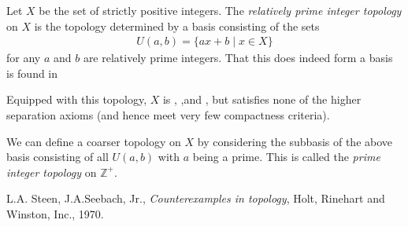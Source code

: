 \documentclass[12pt]{article}
\newcommand{\mb}{\mathbb}
\newcommand{\Z}{\mb{Z}}
\newcommand{\<}{\langle}
\renewcommand{\>}{\rangle}
\begin{document}
Let $X$ be the set of strictly positive integers.  The \emph{relatively prime integer topology} on $X$ is the topology determined by a basis consisting of the sets 
\begin{align*}
U(a,b)=\{ax+b\mid x\in X\}
\end{align*}
for any $a$ and $b$ are relatively prime integers.  That this does indeed form a basis is found in 

Equipped with this topology, $X$ is , ,and , but satisfies none of the higher separation axioms (and hence meet very few compactness criteria).

We can define a coarser topology on $X$ by considering the subbasis of the above basis consisting of all $U(a,b)$ with $a$ being a prime.  This is called the \emph{prime integer topology} on $\Z^+$.

\begin{thebibliography}{9}
 L.A. Steen, J.A.Seebach, Jr.,
\emph{Counterexamples in topology},
Holt, Rinehart and Winston, Inc., 1970.
\end{thebibliography}
\end{document}
